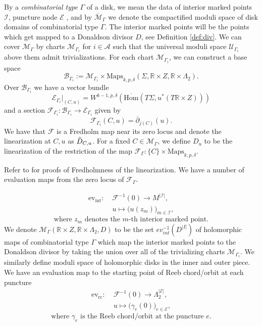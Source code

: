 \documentclass[11pt, oneside,dvipsnames]{amsart}
\renewcommand{\to}{\rightarrow}
\newcommand{\Hom}{\text{Hom}}
\newcommand{\inv}{^{-1}}
\newcommand{\Maps}{\text{Maps}}
\renewcommand{\to}{\rightarrow}
\newcommand{\<}{\langle}
\renewcommand{\>}{\rangle}
\newcommand{\bR}{\mathbb{R}}
\newcommand{\cA}{\mathcal{A}}
\newcommand{\cB}{\mathcal{B}}
\newcommand{\cE}{\mathcal{E}}
\newcommand{\cF}{\mathcal{F}}
\newcommand{\cI}{\mathcal{I}}
\newcommand{\cM}{\mathcal{M}}
\newcommand{\cU}{\mathcal{U}}
\renewcommand{\to}{\rightarrow}
\theoremstyle{definition}
\theoremstyle{definition}
\numberwithin{equation}{subsection}
\begin{document}
By a \textit{combinatorial type} $\Gamma$ of a disk, we mean the data of  interior marked points $\cI$, puncture node $\cE$ , and by $\overline{\cM}_\Gamma$ we denote the compactified moduli space of disk domains of combinatorial type $\Gamma$. The interior marked points will be the points which get mapped to a Donaldson divisor $D$, see Definition \ref{def:div}. We can cover $\cM_\Gamma$ by charts $\cM_{\Gamma_i}$ for $i\in \cA$ such that the universal moduli space $\cU_{\Gamma_i}$ above them admit trivializations. For each chart $\cM_{\Gamma_i}$, we can construct a base space $$\cB_{\Gamma_i}  := \cM_{\Gamma_i} \times \Maps_{k,p,\delta} (\Sigma, \bR \times Z, \bR \times \Lambda_2).  $$
Over $\cB_{\Gamma_i}$ we have a vector bundle $$\cE_{\Gamma_i}|_{(C,u)} = W^{k-1,p,\delta}(\overline{\Hom}(T\Sigma,u^*(T\bR \times Z))) $$ and a section $\cF_{\Gamma_i} : \cB_{\Gamma_i} \to \cE_{\Gamma_i}$ given by $$\cF_{\Gamma_i}(C,u) = \overline{\partial}_{j(C)}(u).$$ We have that $\cF$ is a Fredholm map near its zero locus and denote the linearization at $C,u$ as $\Tilde{D}_{C,u}$. For a fixed $C\in \cM_\Gamma$, we define $D_u$ to be the linearization of the restriction of the map $\cF_\Gamma : \{ C\} \times \Maps_{k,p,\delta}$.

Refer to \cite{wendl:sft,cant2022dimension,Cha23} for proofs of Fredholmness of the linearization. We have a number of evaluation maps from the zero locus of $\cF_{\Gamma}$. 

\[
\begin{aligned}
\mathrm{ev}_{\mathrm{int}} :\;& \mathcal{F}^{-1}(0) \longrightarrow M^{|\mathcal{I}|}, \\
& u \longmapsto \big( u(z_m) \big)_{m \in \mathcal{I}},
\end{aligned}
\]
\[
\text{where } z_m \text{ denotes the } m\text{-th interior marked point.}
\]
We denote $\cM_{\Gamma}(\bR\times Z, \bR \times \Lambda_2, D)$ to be the set $ev_{int}\inv(D^{|I|})$ of holomorphic maps of combinatorial type $\Gamma$ which map the interior marked points to the Donaldson divisor by taking the union over all of the trivializing charts $\cM_{\Gamma_i}$. We similarly define moduli space of holomorphic disks in the inner and outer piece. We have an evaluation map to the starting point of Reeb chord/orbit at each puncture
\[
\begin{aligned}
\mathrm{ev}_{\mathrm{rc}} :\;& \mathcal{F}^{-1}(0) \longrightarrow \Lambda_2^{|\mathcal{E}|}, \\
& u \longmapsto \big( \gamma_e(0) \big)_{e \in \mathcal{E}},
\end{aligned}
\]
\[
\text{where } \gamma_e \text{ is the Reeb chord/orbit at the puncture } e.
\]
\end{document}
